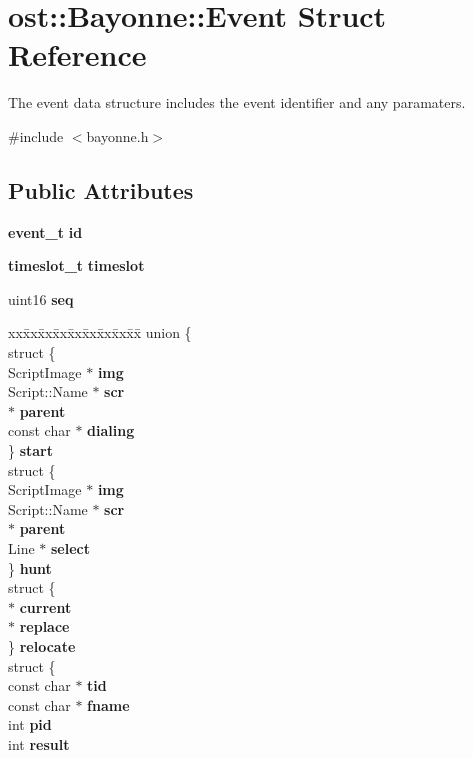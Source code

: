 \section{ost::Bayonne::Event Struct Reference}
\label{structost_1_1_bayonne_1_1_event}


The event data structure includes the event identifier and any paramaters.  


{\ttfamily \#include $<$bayonne.h$>$}\subsection*{Public Attributes}
\begin{DoxyCompactItemize}
\item 
{\bf event\_\-t} {\bf id}
\item 
{\bf timeslot\_\-t} {\bf timeslot}
\item 
uint16 {\bf seq}
\item 
\begin{tabbing}
xx\=xx\=xx\=xx\=xx\=xx\=xx\=xx\=xx\=\kill
union \{\\
\>struct \{\\
\>\>ScriptImage $\ast$ {\bf img}\\
\>\>Script::Name $\ast$ {\bf scr}\\
\> $\ast$ {\bf parent}\\
\>\>const char $\ast$ {\bf dialing}\\
\>\} {\bf start}\\
\>struct \{\\
\>\>ScriptImage $\ast$ {\bf img}\\
\>\>Script::Name $\ast$ {\bf scr}\\
\> $\ast$ {\bf parent}\\
\>\>Line $\ast$ {\bf select}\\
\>\} {\bf hunt}\\
\>struct \{\\
\> $\ast$ {\bf current}\\
\> $\ast$ {\bf replace}\\
\>\} {\bf relocate}\\
\>struct \{\\
\>\>const char $\ast$ {\bf tid}\\
\>\>const char $\ast$ {\bf fname}\\
\>\>int {\bf pid}\\
\>\>int {\bf result}\\

\end{tabbing}
\end{DoxyCompactItemize}
